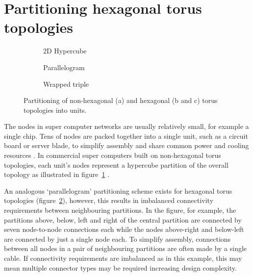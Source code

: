 	\section{Partitioning hexagonal torus topologies}
		
		\begin{figure}
			\center
			\begin{subfigure}[b]{0.32\textwidth}
				\center
				\caption{2D Hypercube}
				\label{fig:hypercube-partitioning}
			\end{subfigure}
			\begin{subfigure}[b]{0.32\textwidth}
				\center
				\caption{Parallelogram}
				\label{fig:parallelogram-partitioning}
			\end{subfigure}
			\begin{subfigure}[b]{0.32\textwidth}
				\center
				\caption{Wrapped triple}
				\label{fig:wrapped-triple-partitioning}
			\end{subfigure}
			
			\caption{Partitioning of non-hexagonal (a) and hexagonal (b and c) torus
			topologies into units.}
			\label{fig:partitioning-options}
		\end{figure}
		
		The nodes in super computer networks are usually relatively small, for
		example a single chip. Tens of nodes are packed together into a single
		unit, such as a circuit board or server blade, to simplify assembly and
		share common power and cooling resources \cite{gilge14,ajima12}. In
		commercial super computers built on non-hexagonal torus topologies, each
		unit's nodes represent a hypercube partition of the overall topology as
		illustrated in figure~\ref{fig:hypercube-partitioning}
		\cite{chen11,ajima12}.
		
		An analogous `parallelogram' partitioning scheme exists for hexagonal torus
		topologies (figure~\ref{fig:parallelogram-partitioning}), however, this
		results in imbalanced connectivity requirements between neighbouring
		partitions. In the figure, for example, the partitions above, below, left and
		right of the central partition are connected by seven node-to-node
		connections each while the nodes above-right and below-left are connected
		by just a single node each. To simplify assembly, connections between all
		nodes in a pair of neighbouring partitions are often made by a single
		cable. If connectivity requirements are imbalanced as in this example, this
		may mean multiple connector types may be required increasing design
		complexity.
		
